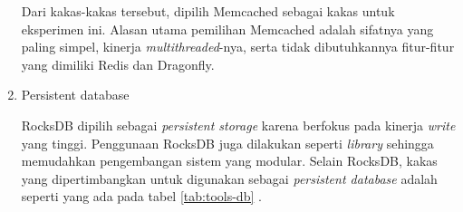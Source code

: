 \begin{enumerate}
    Dari kakas-kakas tersebut, dipilih Memcached sebagai kakas untuk eksperimen ini. Alasan utama pemilihan Memcached adalah sifatnya yang paling simpel, kinerja \textit{multithreaded}-nya, serta tidak dibutuhkannya fitur-fitur yang dimiliki Redis dan Dragonfly.
    
    \item Persistent database
    
    RocksDB dipilih sebagai \textit{persistent storage} karena berfokus pada kinerja \textit{write} yang tinggi. Penggunaan RocksDB juga dilakukan seperti \textit{library} sehingga memudahkan pengembangan sistem yang modular. Selain RocksDB, kakas yang dipertimbangkan untuk digunakan sebagai \textit{persistent database} adalah seperti yang ada pada tabel \ref{tab:tools-db} \parencite{cassandra_docs} \parencite{scylladb_docs} \parencite{rocksdb_docs} \parencite{leveldb_docs} \parencite{mongodb_docs}.


\end{enumerate}
